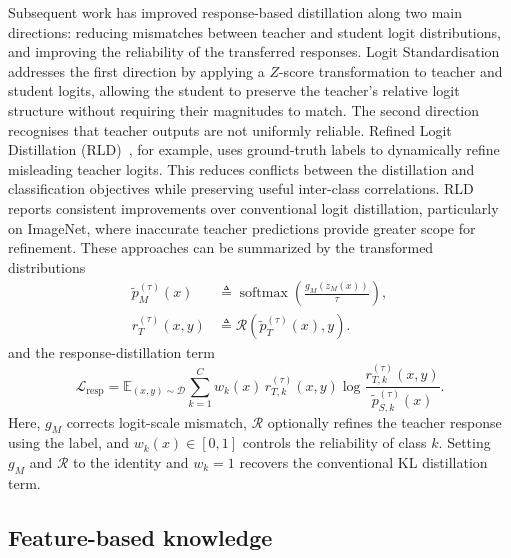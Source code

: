 \documentclass[review,number,sort&compress]{elsarticle}
\theoremstyle{definition}
\begin{document}
Subsequent work has improved response-based distillation along two main directions: reducing mismatches between teacher and student logit distributions, and improving the reliability of the transferred responses. Logit Standardisation~\citep{sun2024logit} addresses the first direction by applying a $Z$-score transformation to teacher and student logits, allowing the student to preserve the teacher's relative logit structure without requiring their magnitudes to match. The second direction recognises that teacher outputs are not uniformly reliable. Refined Logit Distillation (RLD)~\citep{sun2025knowledge}, for example, uses ground-truth labels to dynamically refine misleading teacher logits. This reduces conflicts between the distillation and classification objectives while preserving useful inter-class correlations. RLD reports consistent improvements over conventional logit distillation, particularly on ImageNet, where inaccurate teacher predictions provide greater scope for refinement. These approaches can be summarized by the transformed distributions
\begin{equation}
\label{eq:generic-response-transform}
\begin{aligned}
\widetilde p_M^{(\tau)}(x)
&\triangleq \operatorname{softmax}\!\left(
\frac{g_M(z_M(x))}{\tau}\right), \\
r_T^{(\tau)}(x,y)
&\triangleq \mathcal R\!\left(\widetilde p_T^{(\tau)}(x),y\right).
\end{aligned}
\end{equation}
and the response-distillation term
\begin{equation}
\label{eq:generic-response-loss}
\mathcal L_{\mathrm{resp}}
= \mathbb E_{(x,y)\sim\mathcal D}
\sum_{k=1}^{C} w_k(x)\,r_{T,k}^{(\tau)}(x,y)
\log\!\frac{r_{T,k}^{(\tau)}(x,y)}{\widetilde p_{S,k}^{(\tau)}(x)}.
\end{equation}
Here, $g_M$ corrects logit-scale mismatch, $\mathcal R$ optionally refines the
teacher response using the label, and $w_k(x)\in[0,1]$ controls the reliability
of class $k$. Setting $g_M$ and $\mathcal R$ to the identity and $w_k=1$
recovers the conventional KL distillation term.

\subsection{Feature-based knowledge}
\label{sec:feature-based}
\end{document}
